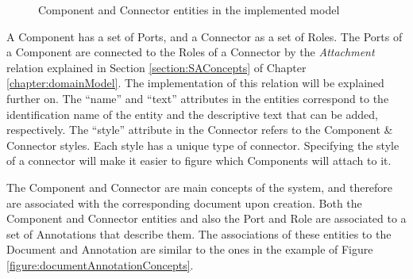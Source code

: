 \begin{figure}[h]
\centering
\renewcommand {\umltextcolor}{black}
\renewcommand {\umlfillcolor}{none}
\renewcommand {\umldrawcolor}{black}
\caption{Component and Connector entities in the implemented model}
\label{figure:modelComponentConnector}
\end{figure}
 
A Component has a set of Ports, and a Connector as a set of Roles. The Ports of a Component are connected to the Roles of a Connector by the \textit{Attachment} relation explained in Section \ref{section:SAConcepts} of Chapter \ref{chapter:domainModel}. The implementation of this relation will be explained further on. The ``name'' and ``text'' attributes in the entities correspond to the identification name of the entity and the descriptive text that can be added, respectively. The ``style'' attribute in the Connector refers to the Component \& Connector styles. Each style has a unique type of connector. Specifying the style of a connector will make it easier to figure which Components will attach to it.

The Component and Connector are main concepts of the system, and therefore are associated with the corresponding document upon creation. Both the Component and Connector entities and also the Port and Role are associated to a set of Annotations that describe them. The associations of these entities to the Document and Annotation are similar to the ones in the example of Figure \ref{figure:documentAnnotationConcepts}.


